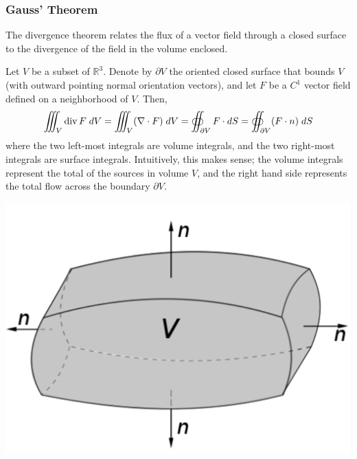   \subsubsection{Gauss' Theorem}
  The divergence theorem relates the flux of a vector field through a closed surface to the divergence of the field in the volume enclosed. 

  \begin{theorem}
  Let $V$ be a subset of $\mathbb{R}^3$. Denote by $\partial V$ the oriented closed surface that bounds $V$ (with outward pointing normal orientation vectors), and let $F$ be a $C^1$ vector field defined on a neighborhood of $V$. Then, 
  \[\iiint_V \Div{F} \; d V = \iiint_V (\nabla \cdot F) \; d V = \oiint_{\partial V} F \cdot d S = \oiint_{\partial V} (F \cdot n) \; dS\]
  where the two left-most integrals are volume integrals, and the two right-most integrals are surface integrals. Intuitively, this makes sense; the volume integrals represent the total of the sources in volume $V$, and the right hand side represents the total flow across the boundary $\partial V$. 
  \begin{center}
      \includegraphics[scale=0.35]{img/Gauss_Theorem_Volume.png}
  \end{center}
  \end{theorem}
